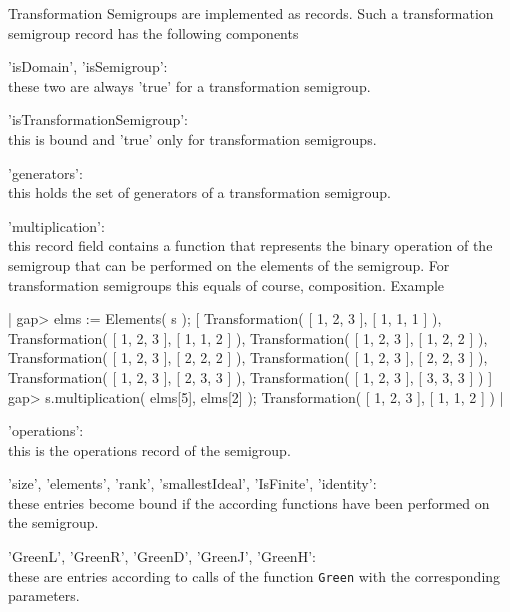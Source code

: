 
Transformation Semigroups are implemented as records.  
Such a transformation semigroup record has the following components\:
  
'isDomain', 'isSemigroup': \\ 
  these two are always 'true' for a transformation semigroup.  

'isTransformationSemigroup': \\ 
  this is bound and 'true' only for transformation semigroups. 

'generators': \\ 
  this holds the set of generators of a transformation semigroup.

'multiplication': \\ 
  this record field contains a function that represents the binary operation 
  of the semigroup that can be performed on the elements of the semigroup. 
  For transformation semigroups this equals of course, composition.
  Example\:\

|  gap> elms := Elements( s );
  [ Transformation( [ 1, 2, 3 ], [ 1, 1, 1 ] ), 
    Transformation( [ 1, 2, 3 ], [ 1, 1, 2 ] ), 
    Transformation( [ 1, 2, 3 ], [ 1, 2, 2 ] ), 
    Transformation( [ 1, 2, 3 ], [ 2, 2, 2 ] ), 
    Transformation( [ 1, 2, 3 ], [ 2, 2, 3 ] ), 
    Transformation( [ 1, 2, 3 ], [ 2, 3, 3 ] ), 
    Transformation( [ 1, 2, 3 ], [ 3, 3, 3 ] ) ]
  gap> s.multiplication( elms[5], elms[2] );
  Transformation( [ 1, 2, 3 ], [ 1, 1, 2 ] )
|

'operations': \\ 
  this is the operations record of the semigroup.

'size', 'elements', 'rank', 'smallestIdeal', 
      'IsFinite', 'identity': \\ 
  these entries become bound if the according functions have been performed
  on the semigroup.

'GreenL', 'GreenR', 'GreenD', 
      'GreenJ', 'GreenH': \\ 
  these are entries according to calls of the function {\tt Green} with
  the corresponding parameters.


